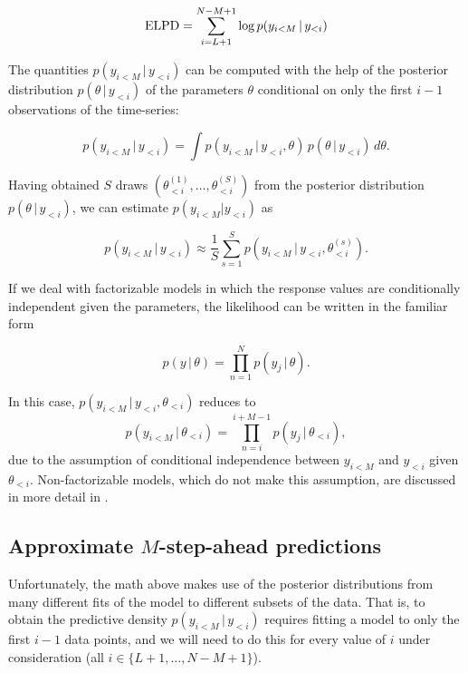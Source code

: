 \documentclass[american,]{article}
\begin{document}
\begin{equation}
{\rm ELPD} = \sum_{i=L+1}^{N - M + 1} \log p(y_{i<M} \,|\, y_{<i})
\end{equation}

The quantities \(p(y_{i<M} \,|\, y_{<i})\) can be computed with the help of the
posterior distribution \(p(\theta \,|\, y_{<i})\) of the parameters \(\theta\)
conditional on only the first \(i-1\) observations of the time-series:

\begin{equation}
p(y_{i<M} \,| \, y_{<i}) = 
  \int p(y_{i<M} \,| \, y_{<i}, \theta) \, p(\theta\,|\,y_{<i}) \,d\theta. 
\end{equation}

Having obtained \(S\) draws \((\theta_{<i}^{(1)}, \ldots, \theta_{<i}^{(S)})\)
from the posterior distribution \(p(\theta\,|\,y_{<i})\), we can estimate
\(p(y_{i<M} | y_{<i})\) as

\begin{equation}
p(y_{i<M} \,|\, y_{<i}) \approx \frac{1}{S}
\sum_{s=1}^S p(y_{i<M} \,|\, y_{<i}, \theta_{<i}^{(s)}).
\end{equation}

If we deal with factorizable models in which the response values are
conditionally independent given the parameters, the likelihood can be written in
the familiar form

\begin{equation}
p(y \,|\, \theta) = \prod_{n=1}^N p(y_j \,|\, \theta).
\end{equation}

In this case, \(p(y_{i<M} \,|\, y_{<i}, \theta_{<i})\) reduces to
\begin{equation}
p(y_{i<M} \,|\, \theta_{<i}) = \prod_{n = i}^{i + M -1} p(y_j \,|\, \theta_{<i}),
\end{equation}
due to the assumption of conditional independence between \(y_{i<M}\) and \(y_{<i}\)
given \(\theta_{<i}\). Non-factorizable models, which do not make this assumption,
are discussed in more detail in \citet{buerkner:non-factorizable}.

\hypertarget{approximate_MSAP}{%
\subsection{\texorpdfstring{Approximate \(M\)-step-ahead predictions}{Approximate M-step-ahead predictions}}\label{approximate_MSAP}}

Unfortunately, the math above makes use of the posterior distributions from many
different fits of the model to different subsets of the data. That is, to obtain
the predictive density \(p(y_{i<M} \,|\, y_{<i})\) requires fitting a model to
only the first \(i-1\) data points, and we will need to do this for every value of
\(i\) under consideration (all \(i \in \{L + 1, \ldots, N - M + 1\}\)).
\end{document}
